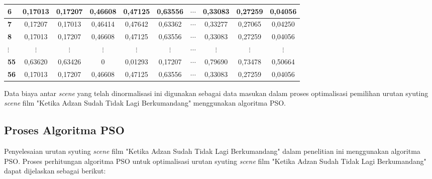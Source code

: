 {{{\begin{tabularx}{\textwidth}{|>{\centering\arraybackslash}p{6mm}|c|c|c|c|c|c|c|c|c|}
            \textbf{6}              & 0,17013    & 0,17207    & 0,46608    & 0,47125    & 0,63556    & $\cdots$          & 0,33083     & 0,27259     & 0,04056     \\ \hline
            \textbf{7}              & 0,17207    & 0,17013    & 0,46414    & 0,47642    & 0,63362    & $\cdots$          & 0,33277     & 0,27065     & 0,04250     \\ \hline
            \textbf{8}              & 0,17013    & 0,17207    & 0,46608    & 0,47125    & 0,63556    & $\cdots$          & 0,33083     & 0,27259     & 0,04056     \\ \hline
            \textbf{$\vdots$}       & $\vdots$   & $\vdots$   & $\vdots$   & $\vdots$   & $\vdots$   & $\cdots$          & $\vdots$    & $\vdots$    & $\vdots$    \\ \hline
            \textbf{55}             & 0,63620    & 0,63426    & 0          & 0,01293    & 0,17207    & $\cdots$          & 0,79690     & 0,73478     & 0,50664     \\ \hline
            \textbf{56}             & 0,17013    & 0,17207    & 0,46608    & 0,47125    & 0,63556    & $\cdots$          & 0,33083     & 0,27259     & 0,04056     \\ \hline
        \end{tabularx}
    }

\noindent
Data biaya antar \textit{scene} yang telah dinormalisasi ini digunakan sebagai data masukan dalam proses optimalisasi pemilihan urutan syuting \textit{scene}  film "Ketika Adzan Sudah Tidak Lagi Berkumandang" menggunakan algoritma PSO.

}

\vspace{-5mm}
\subsection{Proses Algoritma PSO}
{\frenchspacing
    Penyelesaian urutan syuting \textit{scene}  film "Ketika Adzan Sudah Tidak Lagi Berkumandang" dalam penelitian ini menggunakan algoritma PSO.
    Proses perhitungan algoritma PSO untuk optimalisasi urutan syuting \textit{scene}  film "Ketika Adzan Sudah Tidak Lagi Berkumandang" dapat dijelaskan sebagai berikut:


}}
